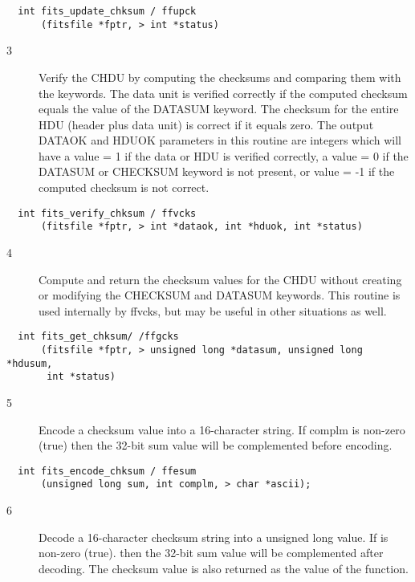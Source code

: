 \documentclass[11pt]{book}
\begin{document}
\begin{verbatim}
  int fits_update_chksum / ffupck
      (fitsfile *fptr, > int *status)
\end{verbatim}

\begin{description}
\item[3 ] Verify the CHDU by computing the checksums and comparing
    them with the keywords.  The data unit is verified correctly
    if the computed checksum equals the value of the DATASUM
    keyword.  The checksum for the entire HDU (header plus data unit) is
    correct if it equals zero.  The output DATAOK and HDUOK parameters
    in this routine are integers which will have a value = 1
    if the data or HDU is verified correctly, a value = 0
    if the DATASUM or CHECKSUM keyword is not present, or value = -1
   if the computed checksum is not correct. \label{ffvcks}
\end{description}

\begin{verbatim}
  int fits_verify_chksum / ffvcks
      (fitsfile *fptr, > int *dataok, int *hduok, int *status)
\end{verbatim}

\begin{description}
\item[4 ] Compute and return the checksum values for the CHDU
    without creating or modifying the
    CHECKSUM and DATASUM keywords.  This routine is used internally by
   ffvcks, but may be useful in other situations as well. \label{ffgcks}
\end{description}

\begin{verbatim}
  int fits_get_chksum/ /ffgcks
      (fitsfile *fptr, > unsigned long *datasum, unsigned long *hdusum,
       int *status)
\end{verbatim}

\begin{description}
\item[5 ] Encode a checksum value
    into a 16-character string.  If complm is non-zero (true) then the 32-bit
   sum value will be complemented before encoding. \label{ffesum}
\end{description}

\begin{verbatim}
  int fits_encode_chksum / ffesum
      (unsigned long sum, int complm, > char *ascii);
\end{verbatim}

\begin{description}
\item[6 ] Decode a 16-character checksum string into a unsigned long value.
    If is non-zero (true). then the 32-bit sum value will be complemented
    after decoding.  The checksum value is also returned as the
   value of the function. \label{ffdsum}
\end{description}
\end{document}
